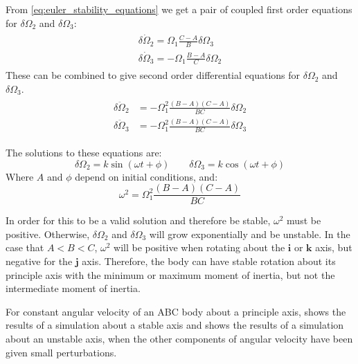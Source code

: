 \documentclass[12]{article}
\begin{document}
\begin{multicols*}{2}
From \cref{eq:euler_stability_equations} we get a pair of coupled first order equations for $\delta\Omega_2$ and $\delta\Omega_3$:
\begin{align}
\label{eq:euler_stability_first_order}
\begin{split}
\delta\dot{\Omega}_2 = \Omega_1\frac{C-A}{B}\delta\Omega_3 \\
\delta\dot{\Omega}_3 = -\Omega_1\frac{B-A}{C}\delta\Omega_2
\end{split}
\end{align}
These can be combined to give second order differential equations for $\delta\Omega_2$ and $\delta\Omega_3$.
\begin{align}
\label{eq:euler_stability_second_order}
\begin{split}
\delta\ddot{\Omega}_2 &= -\Omega_1^2\frac{(B-A)(C-A)}{BC}\delta\Omega_2 \\
\delta\ddot{\Omega}_3 &= -\Omega_1^2\frac{(B-A)(C-A)}{BC}\delta\Omega_3
\end{split}
\end{align}

The solutions to these equations are:
\begin{equation} \label{eq:euler_stability_solution}
\delta\Omega_2 = k\sin{(\omega t + \phi)} \quad\quad
\delta\Omega_3 = k\cos{(\omega t + \phi)}
\end{equation}
Where $A$ and $\phi$ depend on initial conditions, and:
\begin{equation} \label{eq:euler_stability_frequency}
\omega^2 = \Omega_1^2\frac{(B-A)(C-A)}{BC}
\end{equation}

In order for this to be a valid solution and therefore be stable, $\omega^2$ must be positive. Otherwise, $\delta\Omega_2$ and $\delta\Omega_3$ will grow exponentially and be unstable. In the case that $A<B<C$, $\omega^2$ will be positive when rotating about the $\bm{i}$ or $\bm{k}$ axis, but negative for the $\bm{j}$ axis. Therefore, the body can have stable rotation about its principle axis with the minimum or maximum moment of inertia, but not the intermediate moment of inertia.

For constant angular velocity of an ABC body about a principle axis,  shows the results of a simulation about a stable axis and  shows the results of a simulation about an unstable axis, when the other components of angular velocity have been given small perturbations.


\end{multicols*}
\end{document}
